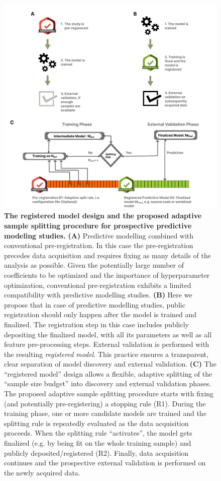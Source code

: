 \documentclass{article}
\begin{document}
\begin{figure}[!htbp]
\centering
\includegraphics[width=0.7\linewidth]{files/fig2-d61bc0fdd16154d439f842daa92da6a0.png}
\caption[]{\textbf{The registered model design and the proposed adaptive sample splitting procedure for prospective predictive modeling studies.} \newline
\textbf{(A)} Predictive modelling combined with conventional pre-registration. In this case the pre-registration precedes data acquisition and requires fixing as many details of the analysis as possible. Given the potentially large number of coefficients to be optimized and the importance of hyperparameter optimization, conventional pre-registration exhibits a limited compatibility with predictive modelling studies. \textbf{(B)} Here we propose that in case of predictive modelling studies, public registration should only happen after the model is trained and finalized. The registration step in this case includes publicly depositing the finalized model, with all its parameters as well as all feature pre-processing steps. External validation is performed with the resulting \textit{registered model}. This practice ensures a transparent, clear separation of model discovery and external validation. \textbf{(C)} The ``registered model'' design allows a flexible, adaptive splitting of the ``sample size budget'' into discovery and external validation phases. The proposed adaptive sample splitting procedure starts with fixing (and potentially pre-registering) a stopping rule (R1). During the training phase, one or more candidate models are trained and the splitting rule is repeatedly evaluated as the data acquisition proceeds. When the splitting rule ``activates'', the model gets finalized (e.g. by being fit on the whole training sample) and publicly deposited/registered (R2). Finally, data acquisition continues and the prospective external validation is performed on the newly acquired data.}
\label{fig2}
\end{figure}
\end{document}
